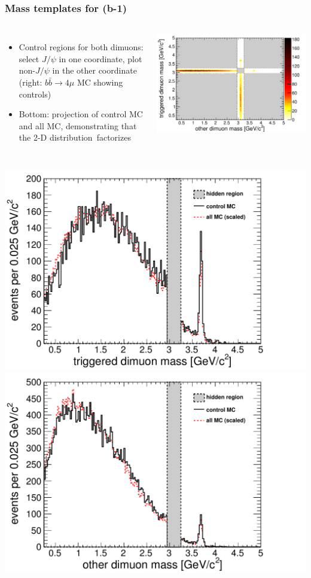 \documentclass[compress]{beamer}
\begin{document}
\begin{frame}
\frametitle{Mass templates for (b-1)}

\begin{columns}

\begin{itemize}
\item Control regions for both dimuons: select $J/\psi$ in one
  coordinate, plot non-$J/\psi$ in the other coordinate (right:
  $b\bar{b} \to 4\mu$ MC showing controls)
\item Bottom: projection of control MC and all MC, demonstrating that
  the 2-D \mbox{distribution factorizes\hspace{-1 cm}}
\end{itemize}

\includegraphics[width=\linewidth]{mc_controlregions.pdf}
\end{columns}

\vspace{0.25 cm}
\includegraphics[width=0.5\linewidth]{mc_controlregions_factorize1.pdf}
\includegraphics[width=0.5\linewidth]{mc_controlregions_factorize2.pdf}
\end{frame}
\end{document}
